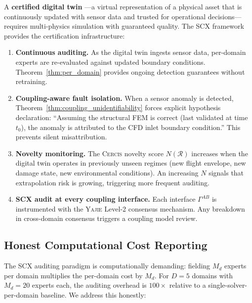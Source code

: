 \documentclass[11pt,a4paper]{article}
\theoremstyle{definition}
\newcommand{\Yajie}{\textsc{Yajie}}
\newcommand{\Cercis}{\textsc{Cercis}}
\newcommand{\SCX}{\textsc{SCX}}
\newcommand{\interface}{\Gamma}
\begin{document}
A \textbf{certified digital twin} \cite{Grieves2017}---a virtual representation of a physical asset that is continuously updated with sensor data and trusted for operational decisions---requires multi-physics simulation with guaranteed quality. The \SCX{} framework provides the certification infrastructure:

\begin{enumerate}[label=(\roman*)]
    \item \textbf{Continuous auditing.} As the digital twin ingests sensor data, per-domain experts are re-evaluated against updated boundary conditions. Theorem~\ref{thm:per_domain} provides ongoing detection guarantees without retraining.
    \item \textbf{Coupling-aware fault isolation.} When a sensor anomaly is detected, Theorem~\ref{thm:coupling_unidentifiability} forces explicit hypothesis declaration: ``Assuming the structural FEM is correct (last validated at time $t_0$), the anomaly is attributed to the CFD inlet boundary condition.'' This prevents silent misattribution.
    \item \textbf{Novelty monitoring.} The \Cercis{} novelty score $N(\mathcal{R})$ increases when the digital twin operates in previously unseen regimes (new flight envelope, new damage state, new environmental conditions). An increasing $N$ signals that extrapolation risk is growing, triggering more frequent auditing.
    \item \textbf{\SCX{} audit at every coupling interface.} Each interface $\interface^{AB}$ is instrumented with the \Yajie{} Level-2 consensus mechanism. Any breakdown in cross-domain consensus triggers a coupling model review.
\end{enumerate}

\subsection{Honest Computational Cost Reporting }

The \SCX{} auditing paradigm is computationally demanding: fielding $M_d$ experts per domain multiplies the per-domain cost by $M_d$. For $D = 5$ domains with $M_d = 20$ experts each, the auditing overhead is $100\times$ relative to a single-solver-per-domain baseline. We address this honestly:
\end{document}
